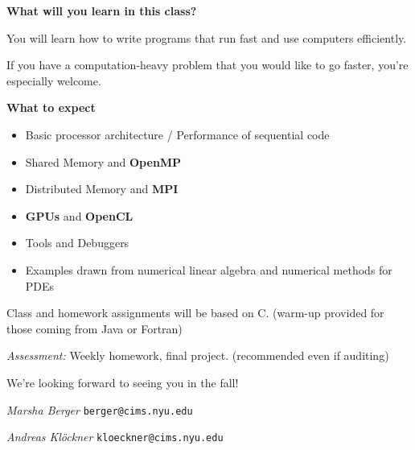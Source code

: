\Large

{\sffamily\Large\bfseries What will you learn in this class?}

You will learn how to write programs that run fast and use computers
efficiently.

If you have a computation-heavy problem that you would like to go
faster, you're especially welcome.

\begin{comment}
\textbf{Pop Quiz:} \$400 at your favorite electronics retailer
buys you a parallel computer that will do
$4\cdot 10^{12}$ floating point operations (``flops'') per second,
but only load $5\cdot 10^{10}$ values from memory in the same
amount of time. How do you use such a machine well?
\end{comment}

\vspace{2.5ex}
{\sffamily\Large\bfseries What to expect}
\vspace{-1.5ex}
\begin{itemize}
\setlength{\itemsep}{-1mm}
  \item Basic processor architecture /
    Performance of sequential code
  \item Shared Memory and \textbf{OpenMP}
  \item Distributed Memory and \textbf{MPI}
  \item \textbf{GPUs} and \textbf{OpenCL}
  \item Tools and Debuggers
  \item Examples drawn from numerical linear algebra and numerical
    methods for PDEs
\end{itemize}

Class and homework assignments will be based on C.
(warm-up provided for those coming from
Java or Fortran)

\emph{Assessment:} Weekly homework, final
project. (recommended even if auditing)

We're looking forward to seeing you in the fall!
\vspace{1.5ex}

\hfill
\begin{minipage}{0.4\columnwidth}
  \raggedright
  \emph{Marsha Berger}
  \small\texttt{berger@cims.nyu.edu}
\end{minipage}
\hfill
\begin{minipage}{0.5\columnwidth}
  \raggedright
  \emph{Andreas Klöckner}
  \small \texttt{kloeckner@cims.nyu.edu}
\end{minipage}

